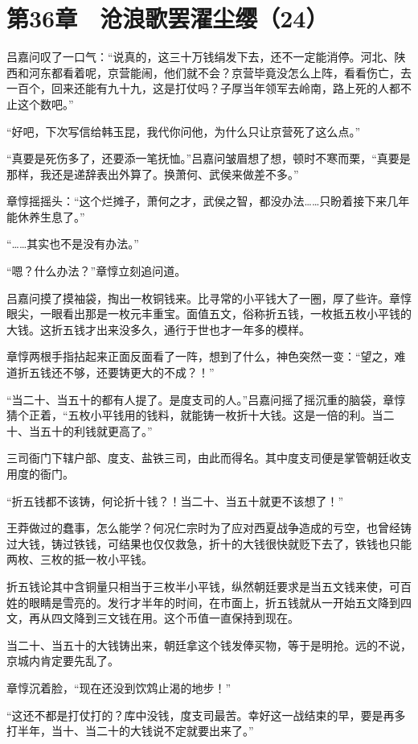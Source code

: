 \section{第36章　沧浪歌罢濯尘缨（24）}

吕嘉问叹了一口气：“说真的，这三十万钱绢发下去，还不一定能消停。河北、陕西和河东都看着呢，京营能闹，他们就不会？京营毕竟没怎么上阵，看看伤亡，去一百个，回来还能有九十九，这是打仗吗？子厚当年领军去岭南，路上死的人都不止这个数吧。”

“好吧，下次写信给韩玉昆，我代你问他，为什么只让京营死了这么点。”

“真要是死伤多了，还要添一笔抚恤。”吕嘉问皱眉想了想，顿时不寒而栗，“真要是那样，我还是递辞表出外算了。换萧何、武侯来做差不多。”

章惇摇摇头：“这个烂摊子，萧何之才，武侯之智，都没办法……只盼着接下来几年能休养生息了。”

“……其实也不是没有办法。”

“嗯？什么办法？”章惇立刻追问道。

吕嘉问摸了摸袖袋，掏出一枚铜钱来。比寻常的小平钱大了一圈，厚了些许。章惇眼尖，一眼看出那是一枚元丰重宝。面值五文，俗称折五钱，一枚抵五枚小平钱的大钱。这折五钱才出来没多久，通行于世也才一年多的模样。

章惇两根手指拈起来正面反面看了一阵，想到了什么，神色突然一变：“望之，难道折五钱还不够，还要铸更大的不成？！”

“当二十、当五十的都有人提了。是度支司的人。”吕嘉问摇了摇沉重的脑袋，章惇猜个正着，“五枚小平钱用的钱料，就能铸一枚折十大钱。这是一倍的利。当二十、当五十的利钱就更高了。”

三司衙门下辖户部、度支、盐铁三司，由此而得名。其中度支司便是掌管朝廷收支用度的衙门。

“折五钱都不该铸，何论折十钱？！当二十、当五十就更不该想了！”

王莽做过的蠢事，怎么能学？何况仁宗时为了应对西夏战争造成的亏空，也曾经铸过大钱，铸过铁钱，可结果也仅仅救急，折十的大钱很快就贬下去了，铁钱也只能两枚、三枚的抵一枚小平钱。

折五钱论其中含铜量只相当于三枚半小平钱，纵然朝廷要求是当五文钱来使，可百姓的眼睛是雪亮的。发行才半年的时间，在市面上，折五钱就从一开始五文降到四文，再从四文降到三文钱在用。这个币值一直保持到现在。

当二十、当五十的大钱铸出来，朝廷拿这个钱发俸买物，等于是明抢。远的不说，京城内肯定要先乱了。

章惇沉着脸，“现在还没到饮鸩止渴的地步！”

“这还不都是打仗打的？库中没钱，度支司最苦。幸好这一战结束的早，要是再多打半年，当十、当二十的大钱说不定就要出来了。”

